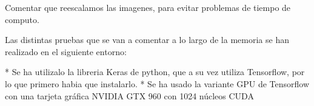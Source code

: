 Comentar que reescalamos las imagenes, para evitar problemas de tiempo de computo.

Las distintas pruebas que se van a comentar a lo largo de la memoria se han realizado en el siguiente entorno:

* Se ha utilizalo la libreria Keras de python, que a su vez utiliza Tensorflow, por lo que primero habia que instalarlo.
* Se ha usado la variante GPU de Tensorflow con una tarjeta gráfica NVIDIA GTX 960 con 1024 núcleos CUDA 
